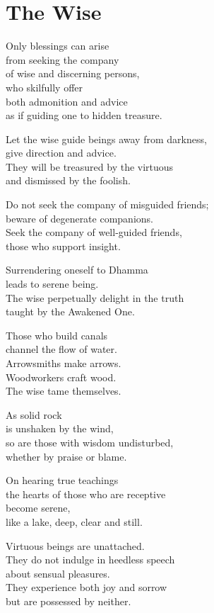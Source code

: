 
\chapter{The Wise}


Only blessings can arise\\
from seeking the company\\
of wise and discerning persons,\\
who skilfully offer\\
both admonition and advice\\
as if guiding one to hidden treasure.


Let the wise guide beings away from darkness,\\
give direction and advice.\\
They will be treasured by the virtuous\\
and dismissed by the foolish.


Do not seek the company of misguided friends;\\
beware of degenerate companions.\\
Seek the company of well-guided friends,\\
those who support insight.


Surrendering oneself to Dhamma\\
leads to serene being.\\
The wise perpetually delight in the truth\\
taught by the Awakened One.


Those who build canals\\
channel the flow of water.\\
Arrowsmiths make arrows.\\
Woodworkers craft wood.\\
The wise tame themselves.


As solid rock\\
is unshaken by the wind,\\
so are those with wisdom undisturbed,\\
whether by praise or blame.


On hearing true teachings\\
the hearts of those who are receptive\\
become serene,\\
like a lake, deep, clear and still.


Virtuous beings are unattached.\\
They do not indulge in heedless speech\\
about sensual pleasures.\\
They experience both joy and sorrow\\
but are possessed by neither.


